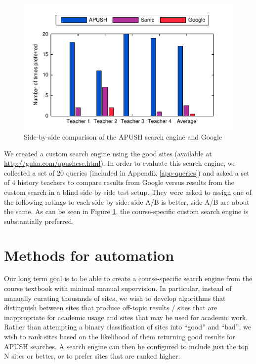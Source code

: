 \documentclass[pdfpagelabels=false,plainpages=true]{acm_proc_article-sp}
\begin{document}
\begin{figure}
\includegraphics{teacher_eval}
\caption{Side-by-side comparison of the APUSH search engine and Google}
\label{fig-eval}
\end{figure}

We created a custom search engine using the good sites (available at
\url{http://guha.com/apushcse.html}). In order to evaluate this search engine,
we collected a set of 20 queries (included in Appendix \ref{app-queries}) and
asked a set of 4 history teachers to compare results from Google versus results
from the custom search in a blind side-by-side test setup. They were asked to
assign one of the following ratings to each side-by-side: side A/B is better,
side A/B are about the same. As can be seen in Figure \ref{fig-eval}, the
course-specific custom search engine is substantially preferred.

\section{Methods for automation}

Our long term goal is to be able to create a course-specific search engine from
the course textbook with minimal manual supervision. In particular, instead of manually
curating thousands of sites, we wish to develop algorithms that distinguish
between sites that produce off-topic results / sites that are inappropriate for 
academic usage and sites that may be used for academic work.  Rather than
attempting a binary classification of sites into ``good'' and ``bad'', we wish
to rank sites based on the likelihood of them returning good results for APUSH
searches. A search engine can then be configured to include just the top N sites
or better, or to prefer sites that are ranked higher. 
\end{document}
